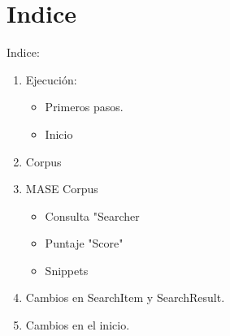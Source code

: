 \section*{Indice}

\begin{frame}
Indice:    
    \begin{enumerate}
        \item Ejecución:
        \begin{itemize}
            \item Primeros pasos.
            \item Inicio
        \end{itemize}
        \item Corpus
        \item MASE Corpus
            \begin{itemize}
                \item Consulta "Searcher
                \item Puntaje "Score"
                \item Snippets
            \end{itemize}
        \item Cambios en SearchItem y SearchResult.
        \item Cambios en el inicio.
    \end{enumerate}
\end{frame}